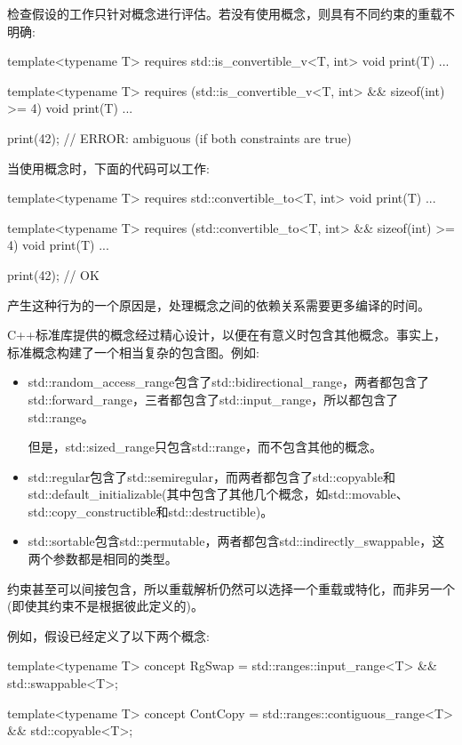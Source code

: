 检查假设的工作只针对概念进行评估。若没有使用概念，则具有不同约束的重载不明确:

\begin{cpp}
template<typename T>
requires std::is_convertible_v<T, int>
void print(T) {
	...
}

template<typename T>
requires (std::is_convertible_v<T, int> && sizeof(int) >= 4)
void print(T) {
	...
}

print(42); // ERROR: ambiguous (if both constraints are true)
\end{cpp}

当使用概念时，下面的代码可以工作:

\begin{cpp}
template<typename T>
requires std::convertible_to<T, int>
void print(T) {
	...
}

template<typename T>
requires (std::convertible_to<T, int> && sizeof(int) >= 4)
void print(T) {
	...
}

print(42); // OK
\end{cpp}

产生这种行为的一个原因是，处理概念之间的依赖关系需要更多编译的时间。

C++标准库提供的概念经过精心设计，以便在有意义时包含其他概念。事实上，标准概念构建了一个相当复杂的包含图。例如:

\begin{itemize}
\item
std::random\_access\_range包含了std::bidirectional\_range，两者都包含了std::forward\_range，三者都包含了std::input\_range，所以都包含了std::range。

但是，std::sized\_range只包含std::range，而不包含其他的概念。

\item
std::regular包含了std::semiregular，而两者都包含了std::copyable和std::default\_initializable(其中包含了其他几个概念，如std::movable、std::copy\_constructible和std::destructible)。

\item
std::sortable包含std::permutable，两者都包含std::indirectly\_swappable，这两个参数都是相同的类型。
\end{itemize}


约束甚至可以间接包含，所以重载解析仍然可以选择一个重载或特化，而非另一个(即使其约束不是根据彼此定义的)。

例如，假设已经定义了以下两个概念:

\begin{cpp}
template<typename T>
concept RgSwap = std::ranges::input_range<T> && std::swappable<T>;

template<typename T>
concept ContCopy = std::ranges::contiguous_range<T> && std::copyable<T>;
\end{cpp}

